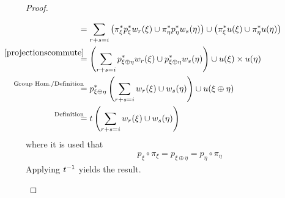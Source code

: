 \begin{Thm}
\begin{proof}
\begin{description}
\begin{align*}
        &= \sum_{r+s=i}
          \left(
          \pb\pi_\xi \pb p_\xi \w_r(\xi) \cup
          \pb\pi_\eta\pb p_\eta\w_s(\eta)\right)
          \cup
          \left(\pb\pi_\xi\u(\xi) \cup \pb\pi_\eta\u(\eta)\right) \\
        &\overset{\mathllap{\eqref{projectionscommute}}} =
          \left(\sum_{r+s=i}
          \pb p_{\xi\oplus\eta} \w_r(\xi) \cup \pb p_{\xi\oplus\eta} \w_s(\eta)
          \right)
          \cup
          \u(\xi) \times \u(\eta) \\
        &\overset{\mathllap{\text{Group Hom./Definition}}}=
          \pb p_{\xi\oplus\eta}
          \left(\sum_{r+s=i}\w_r(\xi)\cup\w_s(\eta)\right)
          \cup
          \u(\xi\oplus\eta)\\
        &\overset{\mathllap{\text{Definition}}}=
          \thomiso\left(\sum_{r+s=i}\w_r(\xi)\cup\w_s(\eta)\right)
      \end{align*}
      where it is used that
      \begin{gather}\label{projectionscommute}
        p_\xi\circ\pi_\xi = p_{\xi\oplus\eta} = p_\eta\circ\pi_\eta
      \end{gather}
      Applying $t^{-1}$ yields the result.
      \qedhere
    \end{description}
  \end{proof}
\end{Thm}



